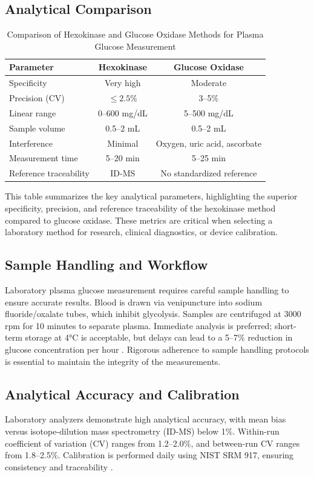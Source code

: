 \documentclass[12pt,a4paper]{article}
\begin{document}
\subsection{Analytical Comparison}
\begin{table}[h!]
\centering
\caption{Comparison of Hexokinase and Glucose Oxidase Methods for Plasma Glucose Measurement}
\begin{tabular}{l c c}
\hline
\textbf{Parameter} & \textbf{Hexokinase} & \textbf{Glucose Oxidase} \\
\hline
Specificity & Very high & Moderate \\
Precision (CV) & $\leq 2.5\%$ & 3--5\% \\
Linear range & 0--600 mg/dL & 5--500 mg/dL \\
Sample volume & 0.5--2 mL & 0.5--2 mL \\
Interference & Minimal & Oxygen, uric acid, ascorbate \\
Measurement time & 5--20 min & 5--25 min \\
Reference traceability & ID-MS & No standardized reference \\
\hline
\end{tabular}
\label{tab:method_comparison}
\end{table}
\noindent
This table summarizes the key analytical parameters, highlighting the superior specificity, precision, and reference traceability of the hexokinase method compared to glucose oxidase. These metrics are critical when selecting a laboratory method for research, clinical diagnostics, or device calibration.

\subsection{Sample Handling and Workflow}
Laboratory plasma glucose measurement requires careful sample handling to ensure accurate results. Blood is drawn via venipuncture into sodium fluoride/oxalate tubes, which inhibit glycolysis. Samples are centrifuged at 3000 rpm for 10 minutes to separate plasma. Immediate analysis is preferred; short-term storage at 4°C is acceptable, but delays can lead to a 5–7\% reduction in glucose concentration per hour \cite{NCBI2023}. Rigorous adherence to sample handling protocols is essential to maintain the integrity of the measurements.

\subsection{Analytical Accuracy and Calibration}
Laboratory analyzers demonstrate high analytical accuracy, with mean bias versus isotope-dilution mass spectrometry (ID-MS) below 1\%. Within-run coefficient of variation (CV) ranges from 1.2–2.0\%, and between-run CV ranges from 1.8–2.5\%. Calibration is performed daily using NIST SRM 917, ensuring consistency and traceability \cite{Sacks2011}.
\end{document}
